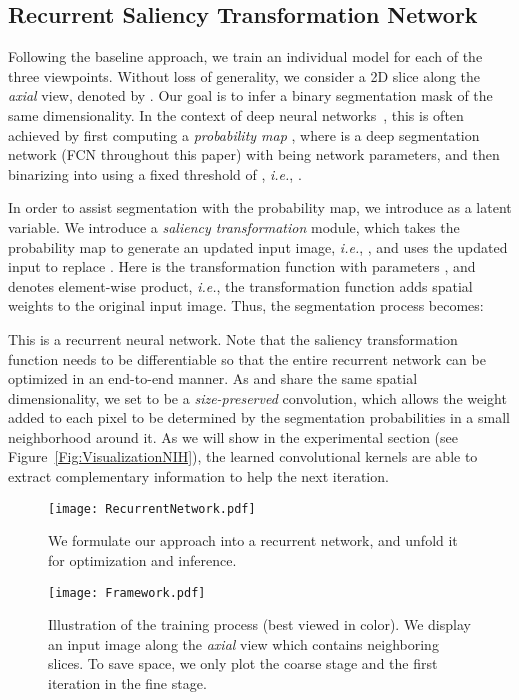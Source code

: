 \documentclass[10pt,twocolumn,letterpaper]{article}
\begin{document}
\subsection{Recurrent Saliency Transformation Network}
\label{Approach:Formulation}

Following the baseline approach, we train an individual model for each of the three viewpoints.
Without loss of generality, we consider a 2D slice along the {\em axial} view, denoted by .
Our goal is to infer a binary segmentation mask  of the same dimensionality.
In the context of deep neural networks~\cite{Long_2015_Fully}\cite{Chen_2015_Semantic},
this is often achieved by first computing a {\em probability map}
,
where  is a deep segmentation network
(FCN throughout this paper) with  being network parameters,
and then binarizing  into  using a fixed threshold of ,
{\em i.e.}, .

In order to assist segmentation with the probability map, we introduce  as a latent variable.
We introduce a {\em saliency transformation} module, which takes the probability map to generate an updated input image,
{\em i.e.}, ,
and uses the updated input  to replace .
Here  is the transformation function with parameters ,
and  denotes element-wise product,
{\em i.e.}, the transformation function adds spatial weights to the original input image.
Thus, the segmentation process becomes:

This is a recurrent neural network.
Note that the saliency transformation function 
needs to be differentiable so that the entire recurrent network can be optimized in an end-to-end manner.
As  and  share the same spatial dimensionality,
we set  to be a {\em size-preserved} convolution,
which allows the weight added to each pixel to be determined by the segmentation probabilities in a small neighborhood around it.
As we will show in the experimental section (see Figure~\ref{Fig:VisualizationNIH}),
the learned convolutional kernels are able to extract complementary information to help the next iteration.

\renewcommand{\figurewidth}{8.0cm}
\begin{figure}[t]
\begin{center}
    \texttt{[image: RecurrentNetwork.pdf]}
\end{center}
\caption{
    We formulate our approach into a recurrent network, and unfold it for optimization and inference.
}
\label{Fig:RecurrentNetwork}
\end{figure}

\renewcommand{\figurewidth}{15.0cm}
\begin{figure*}[t]
\begin{center}
    \texttt{[image: Framework.pdf]}
\end{center}
\caption{
    Illustration of the training process (best viewed in color).
    We display an input image along the {\em axial} view which contains  neighboring slices.
    To save space, we only plot the coarse stage and the first iteration in the fine stage.
}
\label{Fig:Framework}
\end{figure*}
\end{document}
